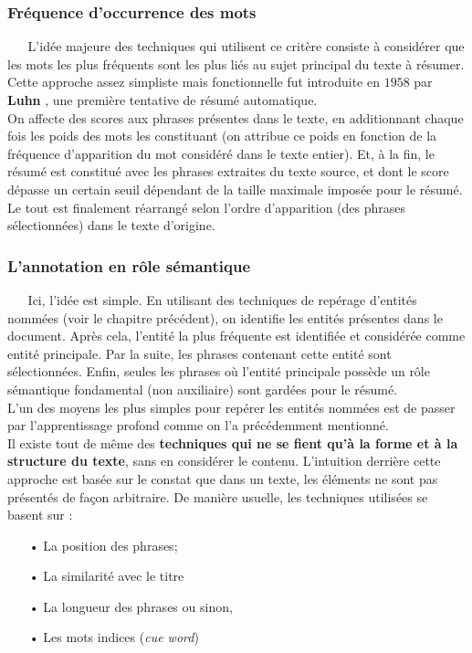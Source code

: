 \subsubsection{Fréquence d'occurrence des mots}
$ _{} $ $ _{} $ $ _{} $ $ _{} $ $ _{} $L'idée majeure des techniques qui utilisent ce critère consiste à considérer que les mots les plus fréquents sont les plus liés au sujet principal du texte à résumer. Cette approche assez simpliste mais fonctionnelle fut introduite en $ 1958 $ par \textbf{Luhn} \cite{Luhn58}, une première tentative de résumé automatique.\\
On affecte des scores aux phrases présentes dans le texte, en additionnant chaque fois les poids des mots les constituant (on attribue ce poids en fonction de la fréquence d'apparition du mot considéré dans le texte entier). Et, à la fin, le résumé est constitué avec les phrases extraites du texte source, et dont le score dépasse un certain seuil dépendant de la taille maximale imposée pour le résumé. Le tout est finalement réarrangé selon l'ordre d'apparition (des phrases sélectionnées) dans le texte d'origine.
\subsubsection{L'annotation en rôle sémantique}
$ _{} $ $ _{} $ $ _{} $ $ _{} $ $ _{} $Ici, l'idée est simple. En utilisant des techniques de repérage d'entités nommées (voir le chapitre précédent), on identifie les entités présentes dans le document. Après cela, l'entité la plus fréquente est identifiée et considérée comme entité principale. Par la suite, les phrases contenant cette entité sont sélectionnées. Enfin, seules les phrases où l'entité principale possède un rôle sémantique fondamental (non auxiliaire) sont gardées pour le résumé.\\
L'un des moyens les plus simples pour repérer les entités nommées est de passer par l'apprentissage profond comme on l'a précédemment mentionné.\\

Il existe tout de même des \textbf{techniques qui ne se fient qu'à la forme et à la structure du texte}, sans en considérer le contenu. L'intuition derrière cette approche est basée sur le constat que dans un texte, les éléments ne sont pas présentés de façon arbitraire. De manière usuelle, les techniques utilisées se basent sur :
\begin{itemize}
\item[•] La position des phrases;
\item[•] La similarité avec le titre 
\item[•] La longueur des phrases ou sinon,
\item[•] Les mots indices (\textit{cue word})
\end{itemize}
